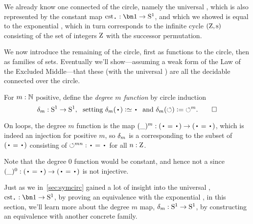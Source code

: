 We already know one connected \covering of the circle, namely the universal \covering, which is also represented by the constant map $\cst\base:\bn 1\to\Sc$, and which we showed is equal to the exponential \covering, which in turn corresponds to the infinite cycle $(\zet,\zs)$
consisting of the set of integers $\mathrm{Z}$ with the successor permutation.

We now introduce the remaining \coverings of the circle, first as functions to the circle, then as families of sets.
Eventually we'll show---assuming a weak form
of the Law of the Excluded Middle---that these (with the universal \covering)
are all the decidable connected \coverings over the circle.

\begin{definition}\label{def:mfoldS1cover}
For $m:\mathbb{N}$ positive, define the \emph{degree $m$ function} by circle induction
\[
\dg{m}:\Sc\to \Sc, \text{~~setting~}
\dg{m}(\base)\defeq\base \text{~~and~}
\dg{m}(\Sloop)\defis{\Sloop}^m.\qedhere
\]
\end{definition}
On loops, the degree $m$ function is the map
$(\blank)^m : (\base=\base) \to (\base=\base)$,
which is indeed an injection for positive $m$,
so $\delta_{m}$ is a \covering corresponding to the subset of $(\base=\base)$ consisting
of ${\Sloop}^{mn} : \base=\base$ for all $n:\mathrm{Z}$.

Note that the degree $0$ function would be constant,
and hence not a \covering since $(\blank)^0 : (\base=\base) \to (\base=\base)$
is not injective.

Just as we in~\cref{sec:symcirc} gained a lot of insight into the universal \covering,
$\cst\base:\bn 1\to\Sc$,
by proving an equivalence with the exponential \covering,
in this section, we'll learn more about the degree $m$ map,
$\delta_{m}:{\mathrm{S}^1}\to{\mathrm{S}^1}$,
by constructing an equivalence with another concrete family.


